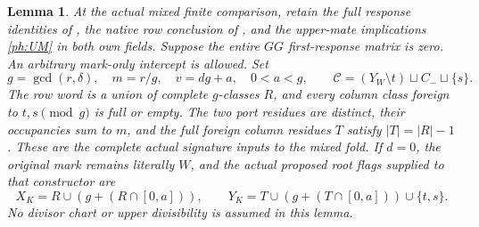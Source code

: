 \documentclass[11pt,a4paper]{amsart}
\numberwithin{equation}{section}
\theoremstyle{plain}
\newtheorem{lemma}[theorem]{Lemma}
\theoremstyle{definition}
\begin{document}
\begin{lemma}\label{ph:zero-matrix}
At the actual mixed finite comparison, retain the full response
identities of , the native row
conclusion of , and the upper-mate implications
\eqref{ph:UM} in both own fields.  Suppose the entire \(GG\)
first-response matrix is zero.  An arbitrary mark-only intercept is
allowed.  Set
\[
 g=\gcd(r,\delta),\quad m=r/g,\quad v=dg+a,\quad 0<a<g,
 \qquad
 \mathcal C=(Y_W\setminus t)\sqcup C_-\sqcup\{s\}.
\]
The row word is a union of complete \(g\)-classes \(R\), and every
column class foreign to \(t,s\pmod g\) is full or empty.
The two port residues are distinct, their occupancies sum to \(m\),
and the full foreign column residues \(T\) satisfy \(|T|=|R|-1\).
These are the complete actual signature inputs to the mixed fold.
If \(d=0\), the original mark remains literally \(W\), and the actual
proposed root flags supplied to that constructor are
\[
 X_K=R\cup(g+(R\cap[0,a])),\qquad
 Y_K=T\cup(g+(T\cap[0,a]))\cup\{t,s\}.
\]
No divisor chart or upper divisibility is assumed in this lemma.
\end{lemma}
\end{document}
